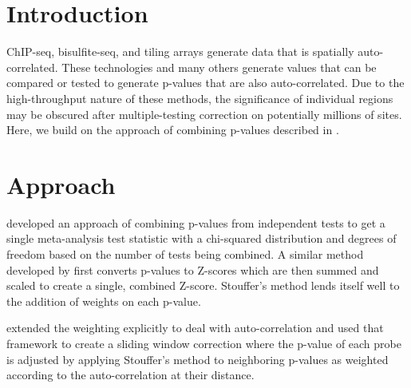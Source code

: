 \documentclass{bioinfo}
\begin{document}
\section{Introduction}
ChIP-seq, bisulfite-seq, and tiling arrays generate data that is spatially
auto-correlated. These technologies and many others generate values that can be
compared or tested to generate p-values that are also auto-correlated. Due to the
high-throughput nature of these methods, the significance of individual regions
may be obscured after multiple-testing correction on potentially millions of sites.
Here, we build on the approach of combining p-values described in \citep{Kechris2010}.

\section{Approach}

\citep{Fisher} developed an approach of combining p-values from independent tests
to get a single meta-analysis test statistic with a chi-squared distribution 
and degrees of freedom based on the number of tests being combined.
A similar method developed by \citep{Stouffer} first converts p-values
to Z-scores which are then summed and scaled to create a single, combined Z-score.
Stouffer's method lends itself well to the addition of weights on each p-value.

\citep{Zaykin} extended the weighting explicitly to deal with auto-correlation and
\citep{Kechris2010} used that framework to create a sliding window correction where
the p-value of each probe is adjusted by applying Stouffer's method to neighboring
p-values as weighted according to the auto-correlation at their distance.
\end{document}

